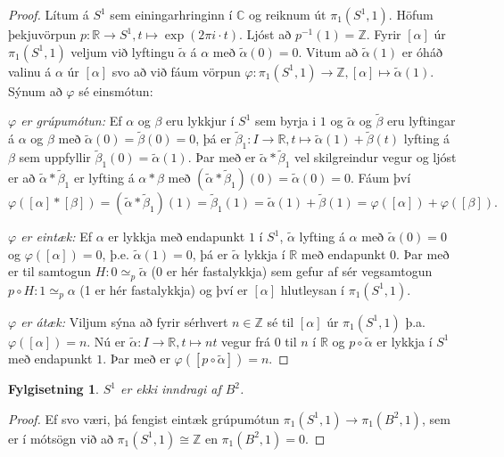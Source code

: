 \documentclass[a4paper,icelandic]{book}
\theoremstyle{definition}
\theoremstyle{plain}
\newtheorem{fylgisetn}{Fylgisetning}[section]
\theoremstyle{remark}
\newcommand{\R}{\mathbb{R}} %
\newcommand{\Z}{\mathbb{Z}} %
\newcommand{\C}{\mathbb{C}} %
\begin{document}
\begin{proof}
  Lítum á $S^1$ sem einingarhringinn í $\C$ og reiknum út
  $\pi_1(S^1,1)$. Höfum þekjuvörpun $p:\R\to S^1,t\mapsto\exp(2\pi
  i\cdot t)$. Ljóst að $p^{-1}(1)=\Z$. Fyrir $[\alpha]$ úr
  $\pi_1(S^1,1)$ veljum við lyftingu $\tilde\alpha$ á $\alpha$ með
  $\tilde\alpha(0)=0$. Vitum að $\tilde\alpha(1)$ er óháð valinu á
  $\alpha$ úr $[\alpha]$ svo að við fáum vörpun
  $\varphi:\pi_1(S^1,1)\to\Z,[\alpha]\mapsto\tilde\alpha(1)$. Sýnum að
  $\varphi$ sé einsmótun:

  \emph{$\varphi$ er grúpumótun:} Ef $\alpha$ og $\beta$ eru lykkjur í
  $S^1$ sem byrja i $1$ og $\tilde\alpha$ og $\tilde\beta$ eru lyftingar
  á $\alpha$ og $\beta$ með $\tilde\alpha(0)=\tilde\beta(0)=0$, þá er
  $\tilde\beta_1:I\to\R,t\mapsto\tilde\alpha(1)+\tilde\beta(t)$ lyfting
  á $\beta$ sem uppfyllir $\tilde\beta_1(0)=\tilde\alpha(1)$. Þar með er
  $\tilde\alpha*\tilde\beta_1$ vel skilgreindur vegur og ljóst er að
  $\tilde\alpha*\tilde\beta_1$ er lyfting á $\alpha*\beta$ með
  $(\tilde\alpha*\tilde\beta_1)(0)=\tilde\alpha(0)=0$. Fáum því \[
  \varphi([\alpha]*[\beta])
  = (\tilde\alpha*\tilde\beta_1)(1)
  = \tilde\beta_1(1)
  = \tilde\alpha(1) + \tilde\beta(1)
  = \varphi([\alpha])+\varphi([\beta]).
  \]

  \emph{$\varphi$ er eintæk:} Ef $\alpha$ er lykkja með endapunkt $1$ í
  $S^1$, $\tilde\alpha$ lyfting á $\alpha$ með $\tilde\alpha(0)=0$ og
  $\varphi([\alpha])=0$, þ.e. $\tilde\alpha(1)=0$, þá er $\tilde\alpha$
  lykkja í $\R$ með endapunkt $0$. Þar með er til samtogun
  $H:0\simeq_p\tilde\alpha$ (0 er hér fastalykkja) sem gefur af sér
  vegsamtogun $p\circ H:1\simeq_p\alpha$ (1 er hér fastalykkja) og því
  er $[\alpha]$ hlutleysan í $\pi_1(S^1,1)$.

  \emph{$\varphi$ er átæk:} Viljum sýna að fyrir sérhvert $n\in\Z$ sé
  til $[\alpha]$ úr $\pi_1(S^1,1)$ þ.a. $\varphi([\alpha])=n$. Nú er
  $\tilde\alpha:I\to\R,t\mapsto nt$ vegur frá $0$ til $n$ í $\R$ og
  $p\circ\tilde\alpha$ er lykkja í $S^1$ með endapunkt $1$. Þar með er
  $\varphi([p\circ\tilde\alpha])=n$.
\end{proof}
\begin{fylgisetn}\label{fylgisetn:brouwer.hjalp}
  $S^1$ er ekki inndragi af $B^2$.
\end{fylgisetn}
\begin{proof}
  Ef svo væri, þá fengist eintæk grúpumótun
  $\pi_1(S^1,1)\to\pi_1(B^2,1)$, sem er í mótsögn við að
  $\pi_1(S^1,1)\cong\Z$ en $\pi_1(B^2,1)=0$.
\end{proof}
\end{document}
